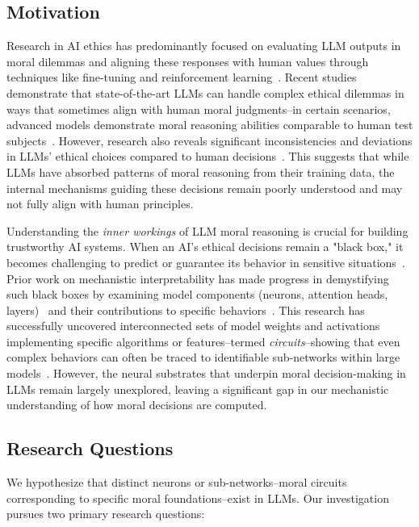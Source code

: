 \documentclass[runninghheads]{llncs}
\begin{document}
\subsection{Motivation}

Research in AI ethics has predominantly focused on evaluating LLM outputs in moral dilemmas and aligning these responses with human values through techniques like fine-tuning and reinforcement learning~\cite{Rao2023}.
Recent studies demonstrate that state-of-the-art LLMs can handle complex ethical dilemmas in ways that sometimes align with human moral judgments--in certain scenarios, advanced models demonstrate moral reasoning abilities comparable to human test subjects~\cite{Tanmay2023}.
However, research also reveals significant inconsistencies and deviations in LLMs' ethical choices compared to human decisions~\cite{Takemoto2024}.
This suggests that while LLMs have absorbed patterns of moral reasoning from their training data, the internal mechanisms guiding these decisions remain poorly understood and may not fully align with human principles.

Understanding the \emph{inner workings} of LLM moral reasoning is crucial for building trustworthy AI systems.
When an AI's ethical decisions remain a "black box," it becomes challenging to predict or guarantee its behavior in sensitive situations~\cite{Templeton2024}.
Prior work on mechanistic interpretability has made progress in demystifying such black boxes by examining model components (neurons, attention heads, layers)~\cite{olah_building_2018,bereska_mechanistic_2024} and their contributions to specific behaviors~\cite{Tlaie2024}.
This research has successfully uncovered interconnected sets of model weights and activations implementing specific algorithms or features--termed \emph{circuits}--showing that even complex behaviors can often be traced to identifiable sub-networks within large models~\cite{Stolfo2023}.
However, the neural substrates that underpin moral decision-making in LLMs remain largely unexplored, leaving a significant gap in our mechanistic understanding of how moral decisions are computed.

\subsection{Research Questions}

We hypothesize that distinct neurons or sub-networks--moral circuits corresponding to specific moral foundations--exist in LLMs. Our investigation pursues two primary research questions:
\end{document}
